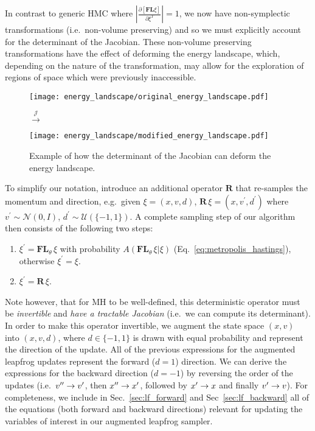 \documentclass[../main.tex]{subfiles}
\begin{document}
In contrast to generic HMC where
$\left|\frac{\partial\left[\mathbf{F}\mathbf{L}\xi\right]}
{\partial\xi^{T}}\right| = 1$, we now have non-symplectic transformations
(i.e.\ non-volume preserving) and so we must explicitly account for the
determinant of the Jacobian.
%
These non-volume preserving transformations have the effect of deforming the
energy landscape, which, depending on the nature of the transformation, may
allow for the exploration of regions of space which were previously
inaccessible.
%
\newcommand{\energyA}{\texttt{[image: energy\_landscape/original\_energy\_landscape.pdf]}}
\newcommand{\energyB}{\texttt{[image: energy\_landscape/modified\_energy\_landscape.pdf]}}
%
\begin{figure}
  \centering 
  \Huge
  \parbox{\widthof{\energyA}}{\energyA} $\overset{\mathcal{J}}{\longrightarrow}$
  \parbox{\widthof{\energyB}}{\energyB} 
  \normalsize
  \caption{Example of how the determinant of the Jacobian can deform the energy landscape.}
\end{figure}
%
To simplify our notation, introduce an additional operator $\mathbf{R}$ that
re-samples the momentum and direction, e.g.\ given $\xi = (x, v, d)$,
$\mathbf{R}\,\xi = (x, v^{\prime}, d^{\prime})$ where $v^{\prime} \sim
\mathcal{N}(0, I)$, $d^{\prime} \sim \mathcal{U}\left(\{-1, 1\}\right)$.
%
A complete sampling step of our algorithm then consists of the following two
steps:
%
\begin{enumerate}
    \item $\xi^{\prime} = \mathbf{FL}_{\theta} \,\xi$ with probability
        $A(\mathbf{FL}_{\theta}\,\xi|\xi)$ (Eq.~\ref{eq:metropolis_hastings}),
        otherwise $\xi^{\prime} = \xi$.
    \item $\xi^{\prime} = \mathbf{R}\,\xi$.
\end{enumerate}
%
Note however, that for MH to be well-defined, this deterministic operator must
be \emph{invertible} and \emph{have a tractable Jacobian} (i.e.\ we can compute
its determinant).
%
In order to make this operator invertible, we augment the state space $(x, v)$
into $(x, v, d)$, where $d \in \{-1, 1\}$ is drawn with equal probability and
represent the direction of the update.
%
All of the previous expressions for the augmented leapfrog updates represent
the forward ($d = 1$) direction.
%
We can derive the expressions for the backward direction ($d = -1$) by
reversing the order of the updates (i.e.\ ${v^{\prime\prime}} \rightarrow {v^{\prime}}$, then ${x^{\prime\prime}}
\rightarrow {x^{\prime}}$, followed by ${x^{\prime}} \rightarrow x$ and finally ${v^{\prime}} \rightarrow
v$).
%
For completeness, we include in Sec.~\ref{sec:lf_forward} and
Sec~\ref{sec:lf_backward} all of the equations (both forward and backward
directions) relevant for updating the variables of interest in our augmented
leapfrog sampler.
\end{document}
